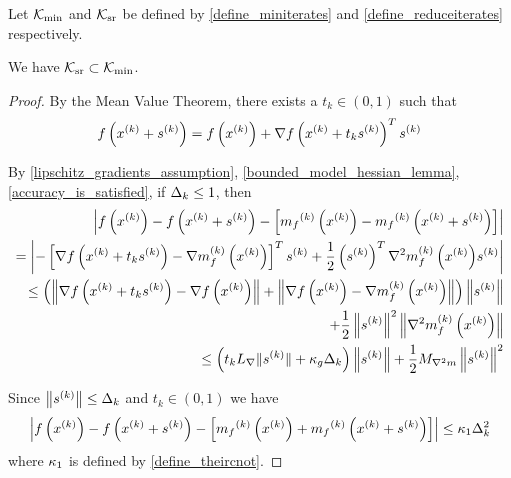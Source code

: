 
\begin{lemma}
\label{mathcal_k_subset_bar_s}

Let ${\mathcal K_{\textrm{min}}}$ and ${\mathcal K_{\textrm{sr}}}$ be defined by \cref{define_miniterates} and \cref{define_reduceiterates} respectively.



We have ${\mathcal K_{\textrm{sr}}} \subset {\mathcal K_{\textrm{min}}}$.
\end{lemma}
 

\begin{proof}
By the Mean Value Theorem, there exists a $t_k \in (0, 1)$ such that
\begin{align*}
f\left(x^{(k)} + {{s}^{(k)}}\right) = f\left(x^{(k)}\right) + \nabla f\left(x^{(k)} + t_k{{s}^{(k)}}\right)^T{{s}^{(k)}}
\end{align*}

By \cref{lipschitz_gradients_assumption}, \cref{bounded_model_hessian_lemma}, \cref{accuracy_is_satisfied}, if $\Delta_k \le 1$, then
\begin{align*}
\left|f\left(x^{(k)}\right) - f\left(x^{(k)} + {{s}^{(k)}}\right) - \left[{{m}_f}^{(k)}\left(x^{(k)}\right) - {{m}_f}^{(k)}\left(x^{(k)} + {{s}^{(k)}}\right)\right]\right| \\
= \left|-\left[\nabla f\left(x^{(k)} + t_k{{s}^{(k)}}\right) - {\nabla m_f^{(k)}\left(x^{(k)}\right)}\right]^T{{s}^{(k)}} + \frac 1 2 \left({{s}^{(k)}}\right)^T {\nabla^2m_f^{(k)}\left(x^{(k)}\right)} {{s}^{(k)}}\right| \\
\le \left(\left\| \nabla f\left(x^{(k)} + t_k{{s}^{(k)}}\right) - \nabla f\left(x^{(k)}\right) \right\| 
+ \left\| \nabla f\left(x^{(k)}\right)-{\nabla m_f^{(k)}\left(x^{(k)}\right)} \right\|\right) \left\|{{s}^{(k)}}\right\| \\
+ \frac 1 2 \left\|{{s}^{(k)}}\right\|^2\left\|{\nabla^2m_f^{(k)}\left(x^{(k)}\right)}\right\| \\
\le \left(t_k {L_{\nabla}} \|{{s}^{(k)}}\| + \kappa_{g}\Delta_k\right) \left\|{{s}^{(k)}}\right\| + \frac 1 2 {M_{\nabla^2 m}} \left\|{{s}^{(k)}}\right\|^2
\end{align*}

Since $\left\| {{s}^{(k)}} \right\| \le \Delta_k$ and $t_k \in (0, 1)$ we have
\begin{align*}
\left|f\left(x^{(k)}\right) - f\left(x^{(k)} + {{s}^{(k)}}\right) - \left[{{m}_f}^{(k)}\left(x^{(k)}\right) + {{m}_f}^{(k)}\left(x^{(k)} + {{s}^{(k)}}\right)\right]\right| \le {\kappa_1} \Delta_k^2
\end{align*}
where ${\kappa_1}$ is defined by \cref{define_theircnot}.


\end{proof}
